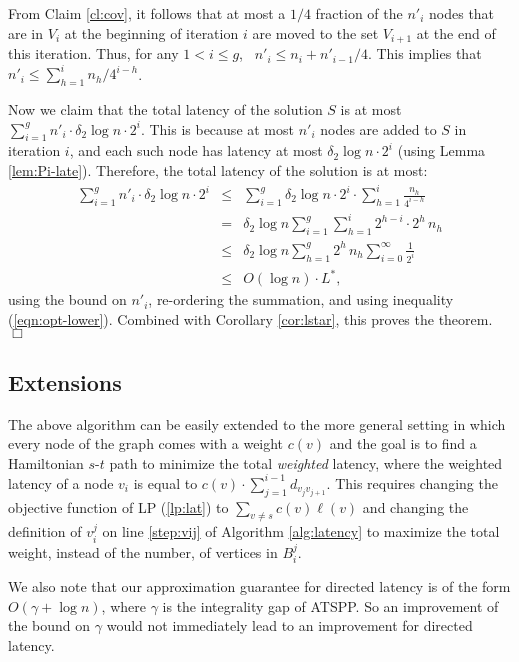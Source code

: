 \documentclass[11pt]{article}
\newcommand{\qed}{\hspace*{\fill}$\Box$}
\newenvironment{proofof}[1]{\medskip \noindent {\bf{Proof of #1. }}}{\qed}
\begin{document}
\begin{proofof}{Theorem \ref{thm:lat}}
From Claim \ref{cl:cov}, it follows that at most
a $1/4$ fraction of the $n'_i$ nodes that are in $V_i$ at the beginning of iteration $i$ are moved to the set $V_{i+1}$ at the end of this iteration. Thus, for any $1<i\leq g$,~ $n'_i \leq n_i + {n'_{i-1}}/{4}$. This implies that $n'_i \leq \sum_{h=1}^i n_h/4^{i-h}$.

Now we claim that the total latency of the solution $S$ is at most
$\sum_{i=1}^{g} n'_i \cdot \delta_2 \log n \cdot 2^i$.
This is because at most $n'_i$ nodes are added to $S$ in iteration $i$, and each such node has latency
at most $\delta_2 \log n \cdot 2^i$ (using Lemma \ref{lem:Pi-late}). 
Therefore, the total latency of the solution is at most:
\begin{eqnarray*}
\sum_{i=1}^{g} n'_i \cdot \delta_2 \log n \cdot 2^i
&\leq& \sum_{i=1}^{g} \delta_2 \log n \cdot 2^i \cdot \sum_{h=1}^i \frac{n_h}{4^{i-h}} \\
&=& \delta_2 \log n \sum_{i=1}^{g} \sum_{h=1}^i 2^{h-i} \cdot  2^h \, n_h \\
&\leq& \delta_2 \log n \sum_{h=1}^{g} 2^h\, n_h \sum_{i=0}^\infty \frac{1}{2^i} \\
&\leq& O(\log n) \cdot L^*,
\end{eqnarray*}
using the bound on $n'_i$, re-ordering the summation, and using inequality (\ref{eqn:opt-lower}). Combined with Corollary \ref{cor:lstar}, this proves the theorem.
\end{proofof}








\subsection{Extensions}
The above algorithm can be easily extended to the more general setting in which every node of the graph comes with a weight $c(v)$ and the goal is to find a Hamiltonian $s$-$t$ path to minimize the total {\em weighted} latency, where the weighted latency of a node $v_i$ is equal to 
$c(v)\cdot\sum_{j=1}^{i-1} d_{v_jv_{j+1}}$. 
This requires changing the objective function of LP (\ref{lp:lat}) to $\sum_{v\neq s} c(v)\ell(v)$ and changing the definition of $v_i^j$ on line \ref{step:vij} of Algorithm \ref{alg:latency} to maximize the total weight, instead of the number, of vertices in $B_i^j$.

We also note that our approximation guarantee for directed latency is of the form $O(\gamma + \log n)$, where $\gamma$ is the integrality gap of ATSPP. So an improvement of the bound on $\gamma$ would not immediately lead to an improvement for directed latency. 
\end{document}
